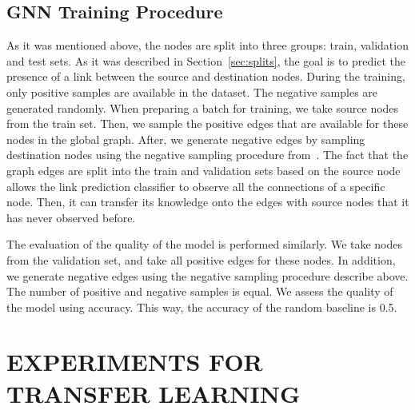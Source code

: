 \documentclass[a4paper,twoside]{article}
\begin{document}
\subsection{GNN Training Procedure}\label{sec:gnn_training}

As it was mentioned above, the nodes are split into three groups: train, validation and test sets. As it was described in Section~\ref{sec:splits}, the goal is to predict the presence of a link between the source and destination nodes. During the training, only positive samples are available in the dataset. The negative samples are generated randomly. When preparing a batch for training, we take source nodes from the train set. Then, we sample the positive edges that are available for these nodes in the global graph. After, we generate negative edges by sampling destination nodes using the negative sampling procedure from~\cite{mikolov2013distributed}. The fact that the graph edges are split into the train and validation sets based on the source node allows the link prediction classifier to observe all the connections of a specific node. Then, it can transfer its knowledge onto the edges with source nodes that it has never observed before.

The evaluation of the quality of the model is performed similarly. We take nodes from the validation set, and take all positive edges for these nodes. In addition, we generate negative edges using the negative sampling procedure describe above. The number of positive and negative samples is equal. We assess the quality of the model using accuracy. This way, the accuracy of the random baseline is 0.5.

\section{\uppercase{Experiments for Transfer Learning}}\label{sec:experiments}
\end{document}

